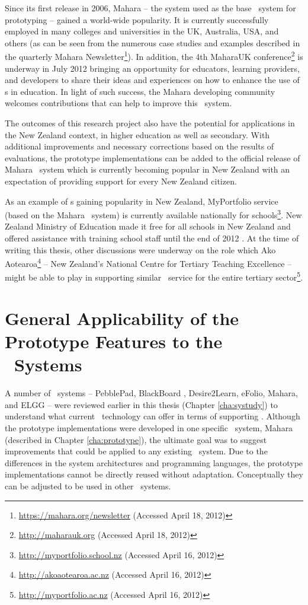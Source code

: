 Since its first release in 2006, Mahara -- the system used as the base
\ep~system for prototyping -- gained a world-wide popularity. It is currently
successfully employed in many colleges and universities in the UK, Australia,
USA, and others (as can be seen from the numerous case studies and examples
described in the quarterly Mahara
Newsletter\footnote{\url{https://mahara.org/newsletter} (Accessed April 18,
2012)}). In addition, the 4th MaharaUK
conference\footnote{\url{http://maharauk.org} (Accessed April 18, 2012)} is
underway in July 2012 bringing an opportunity for educators, learning providers,
and developers to share their ideas and experiences on how to enhance the use of
\ep s in education. In light of such success, the Mahara developing community
welcomes contributions that can help to improve this \ep~system.

The outcomes of this research project also have the potential for applications
in the New Zealand context, in higher education as well as secondary. With
additional improvements and necessary corrections based on the results of
evaluations, the prototype implementations can be added to the official release
of Mahara \ep~system which is currently becoming popular in New Zealand with an
expectation of providing \LLLs support for every New Zealand citizen.

As an example of \ep s gaining popularity in New Zealand, MyPortfolio service
(based on the Mahara \ep~system) is currently available nationally for
schools\footnote{\url{http://myportfolio.school.nz} (Accessed April 16, 2012)}.
New Zealand Ministry of Education made it free for all schools in New Zealand
and offered assistance with training school staff until the end of 2012
\citep{NewZealandMinistryofEducation2012}. At the time of writing this thesis,
other discussions were underway on the role which Ako
Aotearoa\footnote{\url{http://akoaotearoa.ac.nz} (Accessed April 16, 2012)} --
New Zealand's National Centre for Tertiary Teaching Excellence -- might be able
to play in supporting similar \ep~service for the entire tertiary
sector\footnote{\url{http://myportfolio.ac.nz} (Accessed April 16, 2012)}.

\section[General Applicability]{General Applicability of the Prototype
Features to the \ep~Systems}

A number of \ep~systems -- PebblePad, BlackBoard \ep, Desire2Learn, eFolio,
Mahara, and ELGG -- were reviewed earlier in this thesis (Chapter
\ref{cha:systudy}) to understand what current \ep~technology can offer in terms
of supporting \LLLsn. Although the prototype implementations were developed in
one specific \ep~system, Mahara (described in Chapter \ref{cha:prototype}), the
ultimate goal was to suggest improvements that could be applied to any existing
\ep~system. Due to the differences in the system architectures and programming
languages, the prototype implementations cannot be directly reused without
adaptation. Conceptually they can be adjusted to be used in other \ep~systems.

